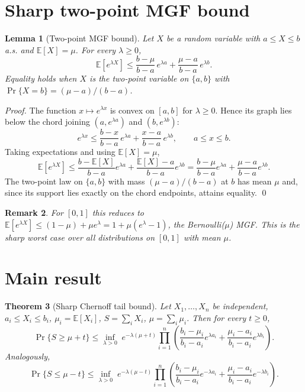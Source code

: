 \documentclass[11pt]{article}
\newtheorem{theorem}{Theorem}[section]
\newtheorem{lemma}[theorem]{Lemma}
\newtheorem{remark}[theorem]{Remark}
\begin{document}
\section{Sharp two-point MGF bound}

\begin{lemma}[Two-point MGF bound]
Let $X$ be a random variable with $a\le X\le b$ a.s. and $\mathbb{E}[X]=\mu$. For every $\lambda\ge0$,
\[
\mathbb{E}[e^{\lambda X}]\le
\frac{b-\mu}{b-a}\,e^{\lambda a}+\frac{\mu-a}{b-a}\,e^{\lambda b}.
\]
Equality holds when $X$ is the two-point variable on $\{a,b\}$ with $\Pr\{X=b\}=(\mu-a)/(b-a)$.
\end{lemma}

\begin{proof}
The function $x\mapsto e^{\lambda x}$ is convex on $[a,b]$ for $\lambda\ge0$. Hence its graph lies below the chord joining $(a,e^{\lambda a})$ and $(b,e^{\lambda b})$:
\[
e^{\lambda x}\le
\frac{b-x}{b-a}\,e^{\lambda a}+\frac{x-a}{b-a}\,e^{\lambda b},
\qquad a\le x\le b.
\]
Taking expectations and using $\mathbb{E}[X]=\mu$,
\[
\mathbb{E}[e^{\lambda X}]
\le \frac{b-\mathbb{E}[X]}{b-a}e^{\lambda a}
+\frac{\mathbb{E}[X]-a}{b-a}e^{\lambda b}
= \frac{b-\mu}{b-a}e^{\lambda a}+\frac{\mu-a}{b-a}e^{\lambda b}.
\]
The two-point law on $\{a,b\}$ with mass $(\mu-a)/(b-a)$ at $b$ has mean $\mu$ and, since its support lies exactly on the chord endpoints, attains equality. \qed
\end{proof}

\begin{remark}
For $[0,1]$ this reduces to $\mathbb{E}[e^{\lambda X}]\le(1-\mu)+\mu e^\lambda=1+\mu(e^\lambda-1)$, the Bernoulli($\mu$) MGF. This is the sharp worst case over all distributions on $[0,1]$ with mean $\mu$.
\end{remark}

\section{Main result}

\begin{theorem}[Sharp Chernoff tail bound]
Let $X_1,\dots,X_n$ be independent, $a_i\le X_i\le b_i$, $\mu_i=\mathbb{E}[X_i]$, $S=\sum_iX_i$, $\mu=\sum_i\mu_i$. Then for every $t\ge0$,
\[
\Pr\{S\ge\mu+t\}
\le
\inf_{\lambda>0}\;
e^{-\lambda(\mu+t)}
\prod_{i=1}^n
\left(
\frac{b_i-\mu_i}{b_i-a_i}e^{\lambda a_i}
+\frac{\mu_i-a_i}{b_i-a_i}e^{\lambda b_i}
\right).
\]
Analogously,
\[
\Pr\{S\le\mu-t\}
\le
\inf_{\lambda>0}\;
e^{-\lambda(\mu-t)}
\prod_{i=1}^n
\left(
\frac{b_i-\mu_i}{b_i-a_i}e^{-\lambda a_i}
+\frac{\mu_i-a_i}{b_i-a_i}e^{-\lambda b_i}
\right).
\]
\end{theorem}
\end{document}
